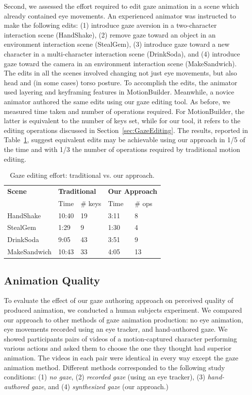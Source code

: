 Second, we assessed the effort required to edit gaze animation in a scene which already contained eye movements. An experienced animator was instructed to make the following edits: (1) introduce gaze aversion in a two-character interaction scene (HandShake), (2) remove gaze toward an object in an environment interaction scene (StealGem), (3) introduce gaze toward a new character in a multi-character interaction scene (DrinkSoda), and (4) introduce gaze toward the camera in an environment interaction scene (MakeSandwich). The edits in all the scenes involved changing not just eye movements, but also head and (in some cases) torso posture. To accomplish the edits, the animator used layering and keyframing features in MotionBuilder. Meanwhile, a novice animator authored the same edits using our gaze editing tool. As before, we measured time taken and number of operations required. For MotionBuilder, the latter is equivalent to the number of keys set, while for our tool, it refers to the editing operations discussed in Section~\ref{sec:GazeEditing}. The results, reported in Table~\ref{tab:GazeEditingEffortResults}, suggest equivalent edits may be achievable using our approach in 1/5 of the time and with 1/3 the number of operations required by traditional motion editing.
%
\begin{table}
\centering
\def\arraystretch{1.5}
\begin{tabular}{|l||l|l|l|l|}
\hline
\textbf{Scene} & \multicolumn{2}{l|}{\textbf{Traditional}} & \multicolumn{2}{l|}{\textbf{Our Approach}} \\
\cline{2-5}
& Time & \# keys & Time & \# ops  \\
\hline
HandShake & 10:40 & 19 & 3:11 & 8 \\
StealGem & 1:29 & 9 & 1:30 & 4 \\
DrinkSoda & 9:05 & 43 & 3:51 & 9 \\
MakeSandwich & 10:43 & 33 & 4:05 & 13 \\
\hline
\end{tabular}
\caption{Gaze editing effort: traditional vs. our approach.}
\label{tab:GazeEditingEffortResults}
\end{table}
%
\subsection{Animation Quality}
\label{sec:GazeAnimationQualityEvaluation}

To evaluate the effect of our gaze authoring approach on perceived quality of produced animation, we conducted a human subjects experiment. We compared our approach to other methods of gaze animation production: no eye animation, eye movements recorded using an eye tracker, and hand-authored gaze. We showed participants pairs of videos of a motion-captured character performing various actions and asked them to choose the one they thought had superior animation. The videos in each pair were identical in every way except the gaze animation method. Different methods corresponded to the following study conditions: (1) \emph{no gaze}, (2) \emph{recorded gaze} (using an eye tracker), (3) \emph{hand-authored gaze}, and (4) \emph{synthesized gaze} (our approach.)

